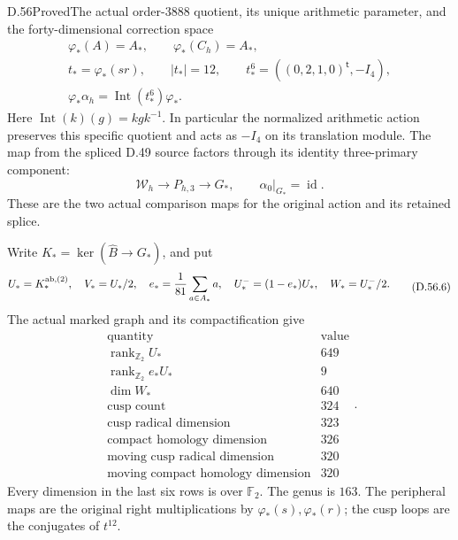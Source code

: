 \begin{statement}{D.56}{Proved}{The actual order-\(3888\) quotient, its unique arithmetic parameter, and the forty-dimensional correction space}
\[\begin{gathered}
 \varphi_*(A)=A_*,\qquad \varphi_*(C_h)=A_*,\\
 t_*=\varphi_*(sr),\qquad
 |t_*|=12,\qquad
 t_*^6=((0,2,1,0)^{\mathsf t},-I_4),\\
 \varphi_*\alpha_h=\operatorname{Int}(t_*^6)\varphi_* .
 \end{gathered}
 \tag{D.56.4}
\]
Here \(\operatorname{Int}(k)(g)=kgk^{-1}\).
In particular the normalized arithmetic action preserves this
specific quotient and acts as \(-I_4\) on its translation module.
The map from the spliced D.49 source factors through its identity
three-primary component:
\[
 \mathcal W_h\longrightarrow P_{h,3}
       \longrightarrow G_*,
 \qquad \alpha_0|_{G_*}=\operatorname{id}.
 \tag{D.56.5}
\]
These are the two actual comparison maps for the original action
and its retained splice.

Write \(K_*=\ker(\widehat B\to G_*)\), and put
\[
 \begin{gathered}
 U_*=K_*^{\mathrm{ab},(2)},\quad V_*=U_*/2,\quad
 e_*={1\over81}\sum_{a\in A_*}a,\quad
 U_*^-=(1-e_*)U_*,\quad W_*=U_*^-/2 .
 \end{gathered}
 \tag{D.56.6}
\]
The actual marked graph and its compactification give
\[
 \begin{array}{c|r}
 \text{quantity}&\text{value}\\ \hline
 \operatorname{rank}_{\mathbb Z_2}U_*&649\\
 \operatorname{rank}_{\mathbb Z_2}e_*U_*&9\\
 \dim W_*&640\\
 \text{cusp count}&324\\
 \text{cusp radical dimension}&323\\
 \text{compact homology dimension}&326\\
 \text{moving cusp radical dimension}&320\\
 \text{moving compact homology dimension}&320
 \end{array}.
 \tag{D.56.7}
\]
Every dimension in the last six rows is over \(\mathbb F_2\).
The genus is \(163\). The peripheral maps are the original
right multiplications by \(\varphi_*(s),\varphi_*(r)\);
the cusp loops are the conjugates of \(t^{12}\).


\end{statement}
